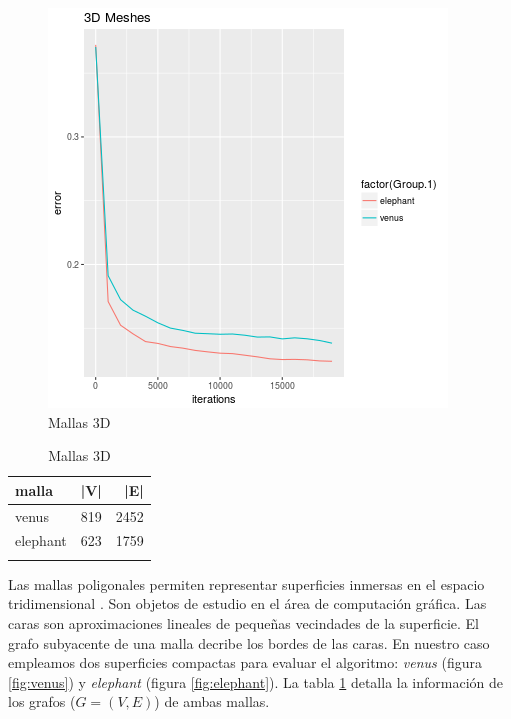 \documentclass[10pt, a4paper, twocolumn]{article} %
\begin{document}
\begin{figure}
	\includegraphics[width=\linewidth]{3dmeshes.png} %
	\caption{Mallas 3D}%
	\label{fig:meshes} %
\end{figure}

\begin{table}
	\caption{Mallas 3D}
	\centering
	\begin{tabular}{llr}
		\toprule
		malla & |V| & |E| \\
		\midrule
		venus & 819 & 2452 \\
		elephant & 623 & 1759 \\
		\bottomrule
		\label{tab:meshes}
	\end{tabular}
\end{table}


Las mallas poligonales permiten representar superficies inmersas en el 
espacio tridimensional \cite{BKPAL:2010}. Son objetos de estudio en el área de 
computación gráfica. Las caras son aproximaciones lineales de pequeñas 
vecindades de la superficie. El grafo subyacente de una malla decribe 
los bordes de las caras. En nuestro caso empleamos dos superficies 
compactas para evaluar el algoritmo: \emph{venus} (figura 
\ref{fig:venus}) y \emph{elephant} (figura \ref{fig:elephant}). 
La tabla \ref{tab:meshes} detalla la información de los grafos 
($G=(V,E)$) de ambas mallas.
\end{document}
